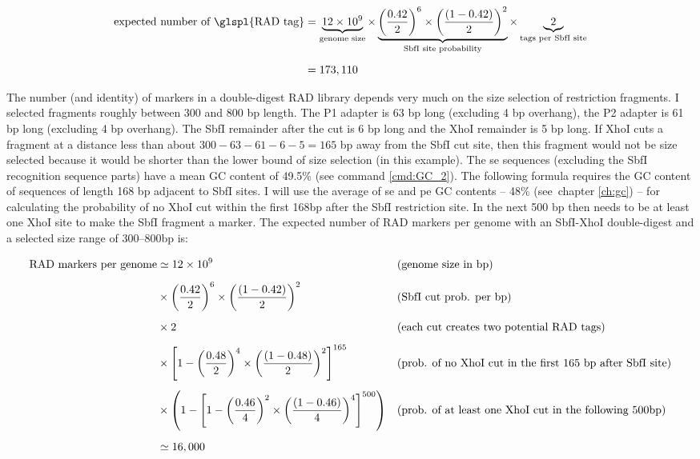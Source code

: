 \documentclass[a4paper,12pt,times,print,index,custombib,custommargin]{PhDThesisPSnPDF}\usepackage[]{graphicx}\usepackage[]{color}
\begin{document}
\scriptsize
\begin{align}
\text{expected number of \glspl{RAD tag}} &= \underbrace{12 \times 10^{9}}_{\text{genome size}} \times 
\underbrace{ \left( \frac{0.42}{2}\right)^{6} \times \left( \frac{(1-0.42)}{2} \right)^{2} }_{\text{SbfI site probability}} \times 
\underbrace{2}_{\text{tags per SbfI site}}
\label{eq:exp_num_standard_RAD_loci} \\[5pt] 
&= 173,110 \nonumber
\end{align}
\normalsize

The number (and identity) of markers in a double-digest RAD library depends very much on the size selection of restriction fragments. I selected fragments roughly between 300 and 800 \gls{bp} length. The P1 adapter is 63 bp long (excluding 4 bp overhang), the P2 adapter is 61 bp long (excluding 4 bp overhang). The \gls{SbfI} remainder after the cut is 6 \gls{bp} long and the \gls{XhoI} remainder is 5 \gls{bp} long. If \gls{XhoI} cuts a fragment at a distance less than about $300 - 63 - 61 -6 -5 = 165$ \gls{bp} away from the SbfI cut site, then this fragment would not be size selected because it would be shorter than the lower bound of size selection (in this example). The \gls{se} sequences (excluding the SbfI recognition sequence parts) have a mean GC content of 49.5\% (see command \ref{cmd:GC_2}). 
The following formula requires the GC content of sequences of length 168 \gls{bp} adjacent to SbfI sites. I will use the average of \gls{se} and \gls{pe} GC contents -- 48\% (see~chapter \ref{ch:gc}) -- for calculating the probability of no XhoI cut within the first 168bp after the SbfI restriction site. In the next 500 \gls{bp} then needs to be at least one \gls{XhoI} site to make the SbfI fragment a marker.
The expected number of RAD markers per genome with an SbfI-XhoI double-digest and a selected size range of 300--800bp is:


\scriptsize
\begin{align} %
\text{RAD markers per genome} &\simeq 12 \times 10^{9} 
	&&\text{(genome size in bp)}  \label{eq:exp_number_ddRAD_loci} \\[5pt]
&\times \left(\frac{0.42}{2}\right)^{6}\times \left(\frac{(1-0.42)}{2}\right)^{2} &&\text{(SbfI cut prob. per bp)} \notag \\[5pt]
&\times 2 
	&&\text{(each cut creates two potential RAD tags)} \notag \\[5pt]
&\times \left[1-\left(\frac{0.48}{2}\right)^{4} \times \left( \frac{(1-0.48)}{2}\right)^{2} \right]^{165} 
	&&\text{(prob. of no XhoI cut in the first 165 bp after SbfI site)} \notag \\[5pt]
&\times \left(1- \left[1-\left(\frac{0.46}{4}\right)^{2} \times \left( \frac{(1-0.46)}{4}\right)^{4} \right]^{500} \right) 
	&&\text{(prob. of at least one XhoI cut in the following 500bp)} \notag \\[5pt]
&\simeq 16,000 \nonumber
\end{align}
\normalsize
\end{document}
